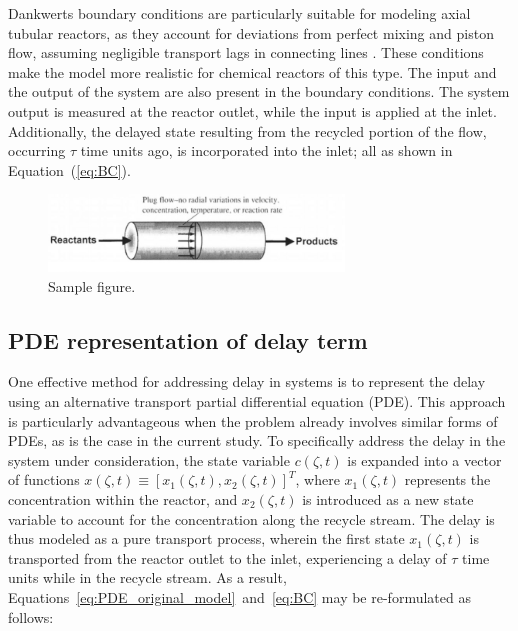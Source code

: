 Dankwerts boundary conditions are particularly suitable for modeling axial tubular reactors, as they account for deviations from perfect mixing and piston flow, assuming negligible transport lags in connecting lines \autocite{danckwerts1993continuous}. These conditions make the model more realistic for chemical reactors of this type. The input and the output of the system are also present in the boundary conditions. The system output is measured at the reactor outlet, while the input is applied at the inlet. Additionally, the delayed state resulting from the recycled portion of the flow, occurring $\tau$ time units ago, is incorporated into the inlet; all as shown in Equation~(\ref{eq:BC}).


\begin{figure}[H]
    \centering
    \includegraphics[width=0.7\textwidth]{Figures/sample.jpeg}
    \caption{Sample figure.}
    \label{fig:reactor_scheme}
\end{figure}

\subsection{PDE representation of delay term}

One effective method for addressing delay in systems is to represent the delay using an alternative transport partial differential equation (PDE). This approach is particularly advantageous when the problem already involves similar forms of PDEs, as is the case in the current study. To specifically address the delay in the system under consideration, the state variable $c(\zeta, t)$ is expanded into a vector of functions $x(\zeta, t) \equiv [x_1(\zeta, t), x_2(\zeta, t)]^T$, where $x_1(\zeta, t)$ represents the concentration within the reactor, and $x_2(\zeta, t)$ is introduced as a new state variable to account for the concentration along the recycle stream. The delay is thus modeled as a pure transport process, wherein the first state $x_1(\zeta, t)$ is transported from the reactor outlet to the inlet, experiencing a delay of $\tau$ time units while in the recycle stream. As a result, Equations~\ref{eq:PDE_original_model}~and~\ref{eq:BC} may be re-formulated as follows:

